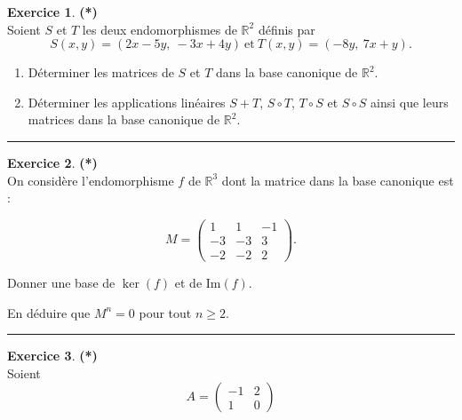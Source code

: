 \documentclass[a4paper,11pt]{article}
\theoremstyle{definition}
\newtheorem{exo}{Exercice} %
\begin{document}
   
\begin{minipage}{1\linewidth}\begin{minipage}[t]{0.48\linewidth}\raggedright
	
\begin{exo}\textbf{(*)}\quad\\[0.2cm]
Soient $S$ et $T$ les deux endomorphismes de $\mathbb R^2$ définis par\quad\\[-0.5cm]

$$
S(x,y)=(2x-5y,\ -3x+4y)\ \text{et}\ T(x,y)=(-8y,\ 7x+y).
$$
\begin{enumerate}
	\item Déterminer les matrices de $S$ et $T$ dans la base canonique de $\mathbb R^2$.
	\item Déterminer les applications linéaires $S+T$, $S\circ T$, $T\circ S$ et $S\circ S$ ainsi que leurs matrices dans la base canonique de $\mathbb R^2$.
\end{enumerate}

	
\centering\rule{1\linewidth}{0.6pt}\end{exo}



\begin{exo}\textbf{(*)}\quad\\[0.2cm]
On considère l'endomorphisme $f$ de $\mathbb R^3$ dont la matrice 
dans la base canonique est :

$$M=\left(
\begin{array}{ccc}
1&1&-1\\
-3&-3&3\\
-2&-2&2
\end{array}\right).$$


Donner une base de $\ker(f)$ et de $\textrm{Im}(f)$.

En déduire que $M^n=0$ pour tout $n\geq 2$.
	
	\centering\rule{1\linewidth}{0.6pt}\end{exo}




\end{minipage}\hfill\vrule\hfill\begin{minipage}[t]{0.48\linewidth}\raggedright

\begin{exo}\textbf{(*)}\quad\\[0.2cm]
Soient $$A=\left(\begin{array}{cc}-1&2\\1&0\end{array}\right)$$


\end{exo}
\end{minipage}
\end{minipage}
\end{document}
